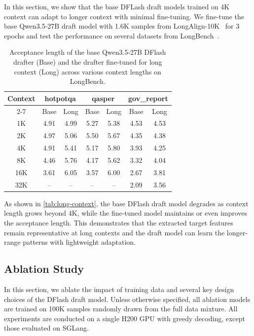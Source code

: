 In this section, we show that the base DFLash draft models trained on 4K context can adapt to longer context with minimal fine-tuning. We fine-tune the base Qwen3.5-27B draft model with 1.6K samples from LongAlign-10K~\citep{bai2024longalign} for 3 epochs and test the performance on several datasets from LongBench~\citep{bai2024longbench}.


\begin{table}[ht]
    \caption{Acceptance length of the base Qwen3.5-27B DFlash drafter (Base) and the drafter fine-tuned for long context (Long) across various context lengths on LongBench.}
    \label{tab:long-context}
    \small
    \centering
    \begin{tabular}{c cc cc cc}
        \toprule
        \multirow{2}[2]{*}{Context} & \multicolumn{2}{c}{hotpotqa} & \multicolumn{2}{c}{qasper} & \multicolumn{2}{c}{gov\_report} \\
        \cmidrule(){2-7}
        & Base & Long & Base & Long & Base & Long \\
        
        \midrule
        1K & 4.91 & 4.99 & 5.27 & 5.38 & 4.53 & 4.53 \\            
        \midrule
        2K & 4.97 & 5.06 & 5.50 & 5.67 & 4.35 & 4.38 \\
        \midrule
        4K & 4.91 & 5.41 & 5.17 & 5.80 & 3.93 & 4.25 \\
        \midrule
        8K & 4.46 & 5.76 & 4.17 & 5.62 & 3.32 & 4.04 \\
        \midrule
        16K & 3.61 & 6.05 & 3.57 & 6.00 & 2.67 & 3.81 \\
        \midrule
        32K & -- & -- & -- & -- & 2.09 & 3.56 \\
        \bottomrule
    \end{tabular}
\end{table}

As shown in \autoref{tab:long-context}, the base DFlash draft model degrades as context length grows beyond 4K, while the fine-tuned model maintains or even improves the acceptance length. This demonstrates that the extracted target features remain representative at long contexts and the draft model can learn the longer-range patterns with lightweight adaptation.

\subsection{Ablation Study}
\label{sec:exp-ablation}
In this section, we ablate the impact of training data and several key design choices of the DFlash draft model. Unless otherwise specified, all ablation models are trained on 100K samples randomly drawn from the full data mixture. All experiments are conducted on a single H200 GPU with greedy decoding, except those evaluated on SGLang.

